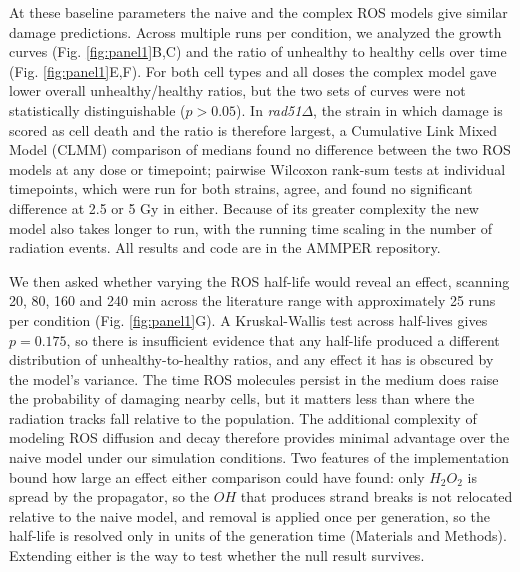 \documentclass{asmarticle}
\begin{document}
At these baseline parameters the naive and the complex ROS models give similar damage predictions. Across multiple runs per condition, we analyzed the growth curves (Fig. \ref{fig:panel1}B,C) and the ratio of unhealthy to healthy cells over time (Fig. \ref{fig:panel1}E,F). For both cell types and all doses the complex model gave lower overall unhealthy/healthy ratios, but the two sets of curves were not statistically distinguishable ($p > 0.05$). In \textit{rad51}$\Delta$, the strain in which damage is scored as cell death and the ratio is therefore largest, a Cumulative Link Mixed Model (CLMM) comparison of medians found no difference between the two ROS models at any dose or timepoint; pairwise Wilcoxon rank-sum tests at individual timepoints, which were run for both strains, agree, and found no significant difference at 2.5 or 5 Gy in either. Because of its greater complexity the new model also takes longer to run, with the running time scaling in the number of radiation events. All results and code are in the AMMPER repository.

We then asked whether varying the ROS half-life would reveal an effect, scanning 20, 80, 160 and 240 min across the literature range with approximately 25 runs per condition (Fig. \ref{fig:panel1}G). A Kruskal-Wallis test across half-lives gives $p = 0.175$, so there is insufficient evidence that any half-life produced a different distribution of unhealthy-to-healthy ratios, and any effect it has is obscured by the model's variance. The time ROS molecules persist in the medium does raise the probability of damaging nearby cells, but it matters less than where the radiation tracks fall relative to the population. The additional complexity of modeling ROS diffusion and decay therefore provides minimal advantage over the naive model under our simulation conditions. Two features of the implementation bound how large an effect either comparison could have found: only $H_2O_2$ is spread by the propagator, so the $OH$ that produces strand breaks is not relocated relative to the naive model, and removal is applied once per generation, so the half-life is resolved only in units of the generation time (Materials and Methods). Extending either is the way to test whether the null result survives.
\end{document}
